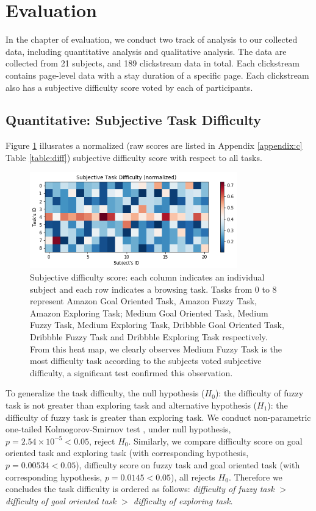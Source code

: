 \section{Evaluation}
\label{ch:eval}

In the chapter of evaluation, we conduct two track of analysis to our collected data, including
quantitative analysis and qualitative analysis. The data are collected from 21 subjects, 
and 189 clickstream data in total. Each clickstream contains page-level data with a stay duration
of a specific page. Each clickstream also has a subjective difficulty score voted by each 
of participants.

\subsection{Quantitative: Subjective Task Difficulty}

Figure \ref{fig:difficulty} illusrates a normalized (raw scores are listed in 
Appendix \ref{appendix:c} Table \ref{table:diff}) subjective difficulty score 
with respect to all tasks.

\begin{figure}[H]
    \centering
    \includegraphics[width=0.8\textwidth]{figures/difficulty}
    \caption{Subjective difficulty score: each column indicates an individual subject and
    each row indicates a browsing task. Tasks from 0 to 8 represent Amazon Goal Oriented Task,
    Amazon Fuzzy Task, Amazon Exploring Task; Medium Goal Oriented Task, Medium Fuzzy Task,
    Medium Exploring Task, Dribbble Goal Oriented Task, Dribbble Fuzzy Task and Dribbble Exploring Task
    respectively.
    From this heat map, we clearly observes Medium Fuzzy Task is the most difficulty task
    according to the subjects voted subjective difficulty, a significant test confirmed this observation.}
    \label{fig:difficulty}
\end{figure}

To generalize the task difficulty, the null hypothesis ($H_0$): the difficulty of fuzzy task is not greater
than exploring task and alternative hypothesis ($H_1$): the difficulty of fuzzy task is greater than
exploring task. We conduct non-parametric one-tailed Kolmogorov-Smirnov test
\cite{massey1951kolmogorov}, under null hypothesis, $p=2.54\times 10^{-5} < 0.05$, reject $H_0$.
Similarly, we compare difficulty score on goal oriented task and exploring task (with corresponding hypothesis, 
$p=0.00534 < 0.05$), difficulty score on fuzzy task and goal oriented task (with corresponding hypothesis, 
$p=0.0145 < 0.05$), all rejects $H_0$. Therefore we concludes the task difficulty is ordered
as follows: \emph{difficulty of fuzzy task $>$ difficulty of goal oriented task $>$ difficulty of exploring task.}

